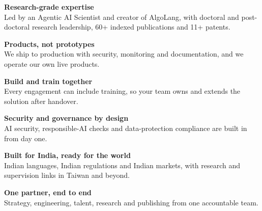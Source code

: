 \documentclass[11pt,a4paper]{article}
\begin{document}
\begin{tcbraster}[raster columns=2,raster equal height=rows,raster column skip=8pt,raster row skip=6pt]
\begin{tcolorbox}[colback=white,colframe=line,borderline west={4pt}{0pt}{saffron},arc=3pt]
{\color{navy}\bfseries Research-grade expertise}\\\small Led by an Agentic AI Scientist and creator of AlgoLang, with doctoral and post-doctoral research leadership, 60+ indexed publications and 11+ patents.
\end{tcolorbox}
\begin{tcolorbox}[colback=white,colframe=line,borderline west={4pt}{0pt}{chakra},arc=3pt]
{\color{navy}\bfseries Products, not prototypes}\\\small We ship to production with security, monitoring and documentation, and we operate our own live products.
\end{tcolorbox}
\begin{tcolorbox}[colback=white,colframe=line,borderline west={4pt}{0pt}{indiagreen},arc=3pt]
{\color{navy}\bfseries Build and train together}\\\small Every engagement can include training, so your team owns and extends the solution after handover.
\end{tcolorbox}
\begin{tcolorbox}[colback=white,colframe=line,borderline west={4pt}{0pt}{gold},arc=3pt]
{\color{navy}\bfseries Security and governance by design}\\\small AI security, responsible-AI checks and data-protection compliance are built in from day one.
\end{tcolorbox}
\begin{tcolorbox}[colback=white,colframe=line,borderline west={4pt}{0pt}{saffron},arc=3pt]
{\color{navy}\bfseries Built for India, ready for the world}\\\small Indian languages, Indian regulations and Indian markets, with research and supervision links in Taiwan and beyond.
\end{tcolorbox}
\begin{tcolorbox}[colback=white,colframe=line,borderline west={4pt}{0pt}{chakra},arc=3pt]
{\color{navy}\bfseries One partner, end to end}\\\small Strategy, engineering, talent, research and publishing from one accountable team.
\end{tcolorbox}
\end{tcbraster}
\end{document}
